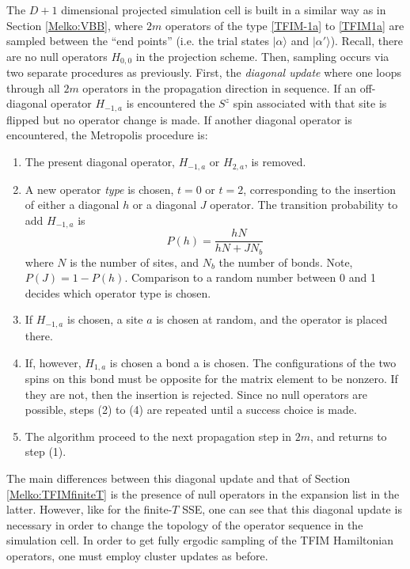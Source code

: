\documentclass[vecphys]{svmult}
\begin{document}
The $D+1$ dimensional projected simulation cell is built in a similar way as in Section \ref{Melko:VBB}, where $2m$ operators of the type \ref{TFIM-1a} to \ref{TFIM1a}  are sampled between the ``end points'' (i.e. the trial states $|\alpha \rangle$ and $|\alpha' \rangle$).  Recall, there are no null operators $H_{0,0}$ in the projection scheme.  Then, sampling occurs via two separate procedures as previously.  First, the {\em diagonal update} where one loops through all $2m$ operators in the propagation direction in sequence. If an off-diagonal operator $H_{-1,a}$ is encountered the $S^z$ spin associated with that site is flipped but no operator change is made.  If another diagonal operator is encountered, the Metropolis procedure is:
\begin{enumerate}
\item The present diagonal operator,  $H_{-1,a}$ or  $H_{2,a}$, is removed. 
\item A new operator {\em type} is chosen, $t=0$ or $t=2$, corresponding to the insertion of either a diagonal $h$ or a diagonal $J$ operator.  The transition probability to add $H_{-1,a}$ is 
\begin{equation}
P(h) = \frac{h N}{hN + JN_b}
\end{equation}
where $N$ is the number of sites, and $N_b$ the number of bonds.  Note, $P(J) = 1- P(h)$.  Comparison to a random number between 0 and 1 decides which operator type is chosen.
\item If $H_{-1,a}$ is chosen, a site $a$ is chosen at random, and the operator is placed there.
\item If, however, $H_{1,a}$ is chosen a {\rm bond} a is chosen.  The configurations of the two spins on this bond must be opposite for the matrix element to be nonzero.  If they are not, then the insertion is rejected.   Since no null operators are possible, steps (2) to (4) are repeated until a success choice is made.
\item The algorithm proceed to the next propagation step in $2m$, and returns to step (1).
\end{enumerate}
The main differences between this diagonal update and that of Section \ref{Melko:TFIMfiniteT} is the presence of null operators in the expansion list in the latter.  However, like for the finite-$T$ SSE, one can see that this diagonal update is necessary in order to change the topology of the operator sequence in the simulation cell.  In order to get fully ergodic sampling of the TFIM Hamiltonian operators, one must employ cluster updates as before.
\end{document}
